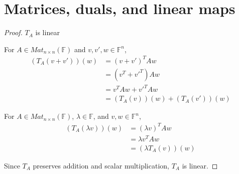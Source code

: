 \section{Matrices, duals, and linear maps}

\begin{proof}$T_A$ is linear\gap

    For $A \in Mat_{n \times n}(\mathbb{F})$
    and $v, v', w \in \mathbb{F}^n$,
    \begin{align}
        (T_A(v+v'))(w)
        &= (v+v')^TAw\\
        &= (v^T+{v'}^T)Aw\\
        &= v^TAw+{v'}^TAw\\
        &= (T_A(v))(w) + (T_A(v'))(w)
    \end{align}

    For $A \in Mat_{n \times n}(\mathbb{F})$,
    $\lambda \in \mathbb{F}$,
    and $v, w \in \mathbb{F}^n$,
    \begin{align}
        (T_A(\lambda v))(w)
        &= (\lambda v)^TAw\\
        &= \lambda v^TAw \\
        &= (\lambda T_{A}(v))(w)
    \end{align}\gap

    Since $T_A$ preserves addition and scalar multiplication,
    $T_A$ is linear.
\end{proof}